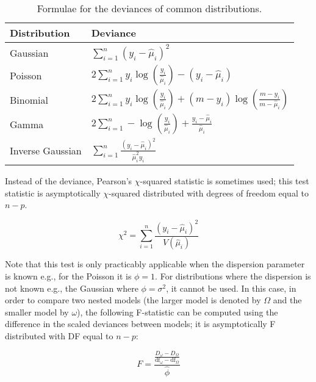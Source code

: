 \documentclass{report}
\renewcommand{\arraystretch}{1.5}
\begin{document}
\renewcommand{\arraystretch}{2}

\begin{table}[h!]
\centering
\begin{tabular}{||l l||} 
 \hline
 \textbf{Distribution} & \textbf{Deviance} \\ [0.5ex] 
  \hline\hline
  Gaussian & $\sum_{i=1}^n \left(y_i - \hat{\mu}_i\right)^2$ \\
  \hline
  Poisson & $2\sum_{i=1}^n y_i \log\left(\frac{y_i}{\hat{\mu}_i}\right) - (y_i - \hat{\mu}_i)$ \\
  \hline
  Binomial & $2\sum_{i=1}^n y_i \log\left(\frac{y_i}{\hat{\mu}_i}\right) + (m-y_i)\log\left(\frac{m-y_i}{m-\hat{\mu}_i}\right)$ \\
  \hline 
  Gamma & $2\sum_{i=1}^n -\log\left(\frac{y_i}{\hat{\mu}_i}\right) + \frac{y_i - \hat{\mu}_i}{\hat{\mu}_i}$ \\
  \hline
  Inverse Gaussian & $\sum_{i=1}^n \frac{\left(y_i - \hat{\mu}_i\right)^2}{\hat{\mu}_i^2y_i}$ \\ 
  \hline
\end{tabular}
\caption{Formulae for the deviances of common distributions.}
\label{table:deviance}
\end{table}

\renewcommand{\arraystretch}{1.5}

Instead of the deviance, Pearson's $\chi$-squared statistic is sometimes used; this test statistic is asymptotically $\chi$-squared distributed with degrees of freedom equal to $n-p$. 

\begin{equation}\label{eq:glm-pearson-chi-squared-statistic}
    \chi^2 = \sum_{i=1}^n \frac{\left(y_i - \hat{\mu}_i\right)^2}{V\left(\hat{\mu}_i\right)}
\end{equation}

Note that this test is only practicably applicable when the dispersion parameter is known e.g., for the Poisson it is $\phi = 1$. For distributions where the dispersion is not known e.g., the Gaussian where $\phi = \sigma^2$, it cannot be used. In this case, in order to compare two nested models (the larger model is denoted by $\Omega$ and the smaller model by $\omega$), the following F-statistic can be computed using the difference in the scaled deviances between models; it is asymptotically F distributed with DF equal to $n - p$:

\begin{equation}\label{eq:glm-f-statistic}
    F = \frac{\frac{D_\omega - D_\Omega}{\text{df}_\omega - \text{df}_\Omega}}{\hat{\phi}}
\end{equation}
\end{document}
